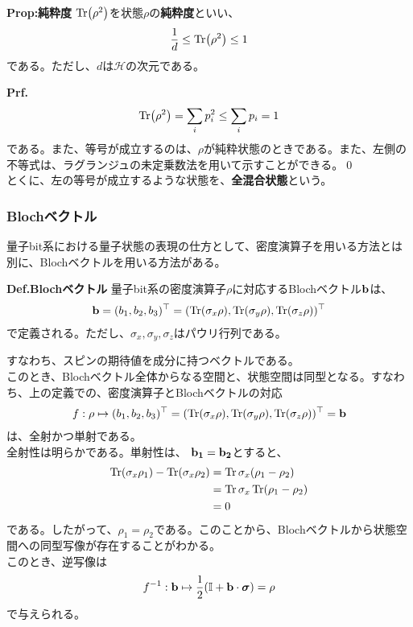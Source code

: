 \documentclass[a4paper,11pt]{jsarticle}
\numberwithin{equation}{section}
\begin{document}
\begin{itembox}[l]{\textbf{Prop:純粋度}}
    $\Tr(\rho^2)$を状態$\rho$の\textbf{純粋度}といい、
    \begin{align}
        \frac{1}{d} \leq \Tr(\rho^2) \leq 1
    \end{align}
    である。ただし、$d$は$\mathcal{H}$の次元である。
\end{itembox}
\textbf{Prf.}\\
\begin{align}
    \Tr(\rho^2) = \sum_i p_i^2 \leq \sum_i p_i = 1
\end{align}
である。また、等号が成立するのは、$\rho$が純粋状態のときである。また、左側の不等式は、ラグランジュの未定乗数法を用いて示すことができる。\qed\\ %
とくに、左の等号が成立するような状態を、\textbf{全混合状態}という。\\

\subsubsection{Blochベクトル}
量子bit系における量子状態の表現の仕方として、密度演算子を用いる方法とは別に、Blochベクトルを用いる方法がある。

\begin{itembox}[l]{\textbf{Def.Blochベクトル}}
    量子bit系の密度演算子$\rho$に対応するBlochベクトル$\vb{b}$は、
    \begin{align}
        \vb{b} = (b_1,b_2,b_3)^{\top} = (\Tr(\sigma_x\rho), \Tr(\sigma_y\rho), \Tr(\sigma_z\rho))^{\top}
    \end{align}
    で定義される。ただし、$\sigma_x, \sigma_y, \sigma_z$はパウリ行列である。
\end{itembox}
すなわち、スピンの期待値を成分に持つベクトルである。\\
このとき、Blochベクトル全体からなる空間と、状態空間は同型となる。すなわち、上の定義での、密度演算子とBlochベクトルの対応
\begin{align}
    f: \rho \mapsto (b_1,b_2,b_3)^{\top} = (\Tr(\sigma_x\rho), \Tr(\sigma_y\rho), \Tr(\sigma_z\rho))^{\top} = \vb{b}
\end{align}
は、全射かつ単射である。\\
全射性は明らかである。単射性は、
$\vb{b_1} = \vb{b_2}$とすると、
\begin{align}
    \Tr(\sigma_x\rho_1) - \Tr(\sigma_x\rho_2) &= \Tr \sigma_x(\rho_1 - \rho_2) \\
    &= \Tr \sigma_x \Tr(\rho_1 - \rho_2)\\
    &= 0
\end{align}
である。したがって、$\rho_1 = \rho_2$である。このことから、Blochベクトルから状態空間への同型写像が存在することがわかる。\\
このとき、逆写像は
\begin{align}
    f^{-1}: \vb{b} \mapsto \frac{1}{2}(\mathbb{I} + \vb{b}\cdot\bm{\sigma}) = \rho
\end{align}
で与えられる。\\
\end{document}
